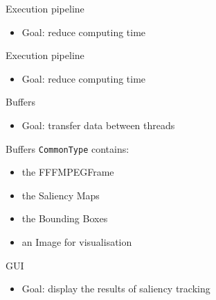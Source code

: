 \documentclass[t,14pt]{beamer}
\begin{document}
\begin{frame}{Execution pipeline}
\vspace*{5mm}
	\begin{itemize}
	\item Goal: reduce computing time
	\end{itemize}
\end{frame}

\begin{frame}{Execution pipeline}
\vspace*{5mm}
	\begin{itemize}
	\item Goal: reduce computing time
	\end{itemize}
\end{frame}

\begin{frame}{Buffers}
\vspace*{5mm}
\begin{itemize}
\item Goal: transfer data between threads 
\end{itemize}
\end{frame}

\begin{frame}{Buffers}
\vspace*{1cm}
\texttt{CommonType} contains:
\begin{itemize}
\item the FFFMPEGFrame
\item the Saliency Maps
\item the Bounding Boxes
\item an Image for visualisation
\end{itemize}
\end{frame}

\begin{frame}{GUI}
\vspace{5mm}
\begin{itemize}
\item Goal: display the results of saliency tracking
\end{itemize}
\vspace{2mm}
\end{frame}
			
\end{document}
